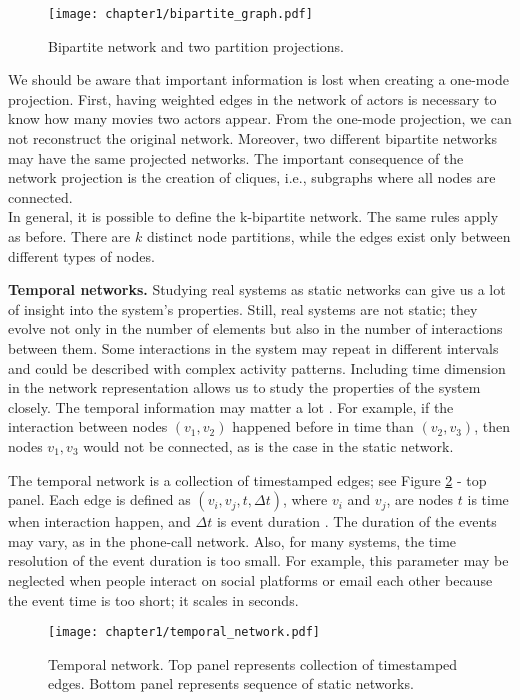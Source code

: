 \begin{figure}[h]
	\centering
	\texttt{[image: chapter1/bipartite\_graph.pdf]} 
	\caption[Bipartite network.]{Bipartite network and two partition projections.}
	\label{fig:bipartite}
\end{figure}

We should be aware that important information is lost when creating a one-mode projection. First, having weighted edges in the network of actors is necessary to know how many movies two actors appear. From the one-mode projection, we can not reconstruct the original network. Moreover, two different bipartite networks may have the same projected networks. The important consequence of the network projection is the creation of cliques, i.e., subgraphs where all nodes are connected. \\
In general, it is possible to define the k-bipartite network. The same rules apply as before. There are $k$ distinct node partitions, while the edges exist only between different types of nodes.

\textbf{Temporal networks.}
Studying real systems as static networks can give us a lot of insight into the system's properties. Still, real systems are not static; they evolve not only in the number of elements but also in the number of interactions between them. Some interactions in the system may repeat in different intervals and could be described with complex activity patterns. Including time dimension in the network representation allows us to study the properties of the system closely. The temporal information may matter a lot \cite{holme2012}. For example, if the interaction between nodes $(v_1, v_2)$ happened before in time than  $(v_2, v_3)$, then nodes $v_1, v_3$ would not be connected, as is the case in the static network. 

The temporal network is a collection of timestamped edges; see Figure \ref{fig:temporal} - top panel. Each edge is defined as $(v_i, v_j, t, \Delta t)$, where $v_i$ and $v_j$, are nodes $t$ is time when interaction happen, and $\Delta t$ is event duration \cite{guide_temporal}. The duration of the events may vary, as in the phone-call network. Also, for many systems, the time resolution of the event duration is too small. For example, this parameter may be neglected when people interact on social platforms or email each other because the event time is too short; it scales in seconds.

\begin{figure}[h]
	\centering
	\texttt{[image: chapter1/temporal\_network.pdf]} 
	\caption[Temporal network.]{Temporal network. Top panel represents collection of timestamped edges. Bottom panel represents sequence of static networks.}
	\label{fig:temporal}
\end{figure}

